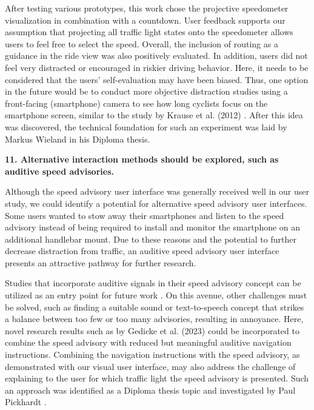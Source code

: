 After testing various prototypes, this work chose the projective speedometer visualization in combination with a countdown. User feedback supports our assumption that projecting all traffic light states onto the speedometer allows users to feel free to select the speed. Overall, the inclusion of routing as a guidance in the ride view was also positively evaluated. In addition, users did not feel very distracted or encouraged in riskier driving behavior. Here, it needs to be considered that the users' self-evaluation may have been biased. Thus, one option in the future would be to conduct more objective distraction studies using a front-facing (smartphone) camera to see how long cyclists focus on the smartphone screen, similar to the study by Krause et al. (2012) \cite{krause_traffic_2012}. After this idea was discovered, the technical foundation for such an experiment was laid by Markus Wieland \cite{wieland_2023} in his Diploma thesis.

\textbf{\color{cidarkblue}11. Alternative interaction methods should be explored, such as auditive speed advisories.} 

Although the speed advisory user interface was generally received well in our user study, we could identify a potential for alternative speed advisory user interfaces. Some users wanted to stow away their smartphones and listen to the speed advisory instead of being required to install and monitor the smartphone on an additional handlebar mount. Due to these reasons and the potential to further decrease distraction from traffic, an auditive speed advisory user interface presents an attractive pathway for further research. 

Studies that incorporate auditive signals in their speed advisory concept can be utilized as an entry point for future work \cite{suramardhana_driver-centric_2014, xu_bb_2015, wilson_driver_2017, sokolov_effects_2018, zhang_green_2020, chen_developing_2022}. On this avenue, other challenges must be solved, such as finding a suitable sound or text-to-speech concept that strikes a balance between too few or too many advisories, resulting in annoyance. Here, novel research results such as by Gedicke et al. (2023) \cite{gedicke_selecting_2023} could be incorporated to combine the speed advisory with reduced but meaningful auditive navigation instructions. Combining the navigation instructions with the speed advisory, as demonstrated with our visual user interface, may also address the challenge of explaining to the user for which traffic light the speed advisory is presented. Such an approach was identified as a Diploma thesis topic and investigated by Paul Pickhardt \cite{pickhardt_2023}.

